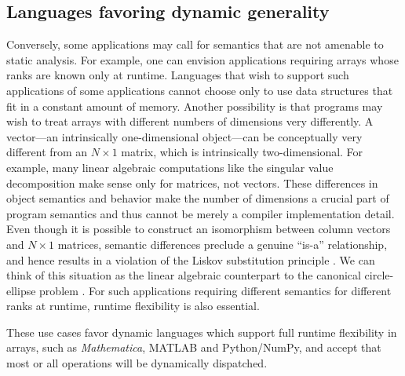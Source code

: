 \documentclass[preprint]{sigplanconf}
\newcommand{\MATLAB}{\textsc{MATLAB}}
\newcommand{\Mathematica}{\textit{Mathematica}}
\begin{document}
\subsection{Languages favoring dynamic generality}

Conversely, some applications may call for semantics that are not amenable to
static analysis. For example, one can envision applications requiring
arrays whose ranks are known only at runtime. Languages that wish to support
such applications of some applications cannot choose only to use data
structures that fit in a constant amount of memory. Another possibility is
that programs may wish to treat arrays with different numbers of dimensions
very differently. A vector---an intrinsically one-dimensional object---can be
conceptually very different from an $N\times1$ matrix, which is intrinsically
two-dimensional. For example, many linear algebraic computations like the
singular value decomposition make sense only for matrices, not vectors. These
differences in object semantics and behavior make the number of dimensions a
crucial part of program semantics and thus cannot be merely a compiler
implementation detail. Even though it is possible to construct an isomorphism
between column vectors and $N\times1$ matrices, semantic differences preclude
a genuine ``is-a'' relationship, and hence results in a violation of the
Liskov substitution principle \cite{Liskov:1987da}. We can think of this
situation as the linear algebraic counterpart to the canonical circle-ellipse
problem \cite{Halbert:1987ut}. For such applications requiring different
semantics for different ranks at runtime, runtime flexibility is also essential.

These use cases favor dynamic languages which support full runtime
flexibility in arrays, such as \Mathematica{}, \MATLAB{} and Python/NumPy,
and accept that most or all operations will be dynamically dispatched.
\end{document}
